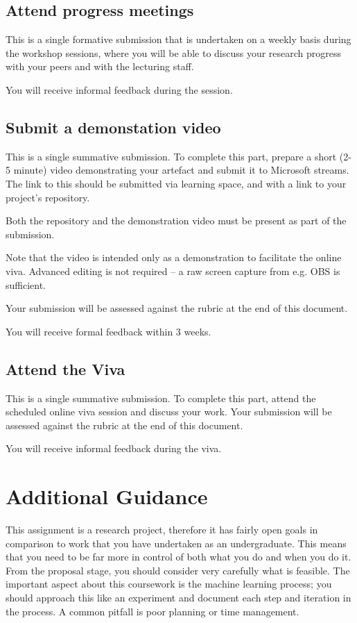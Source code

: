\documentclass{../fal_assignment}
\begin{document}
\subsection*{Attend progress meetings}
This is a single formative submission that is undertaken on a weekly basis during the workshop sessions, where you will be able to discuss your research progress with your peers and with the lecturing staff.

You will receive informal feedback during the session.

\subsection*{Submit a demonstation video}
This is a single summative submission. To complete this part, prepare a short (2-5 minute) video demonstrating your artefact and submit it to Microsoft streams. The link to this should be submitted via learning space, and with a link to your project's repository.

Both the repository and the demonstration video must be present as part of the submission.

Note that the video is intended only as a demonstration to facilitate the online viva. Advanced editing is not required – a raw screen capture from e.g. OBS is sufficient.

Your submission will be assessed against the rubric at the end of this document.

You will receive formal feedback within 3 weeks.

\subsection*{Attend the Viva}
This is a single summative submission. To complete this part, attend the scheduled online viva session and discuss your work. Your submission will be assessed against the rubric at the end of this document.

You will receive informal feedback during the viva.

\section*{Additional Guidance}
This assignment is a research project, therefore it has fairly open goals in comparison to work that you have undertaken as an undergraduate. This means that you need to be far more in control of both what you do and when you do it. From the proposal stage, you should consider very carefully what is feasible. The important aspect about this coursework is the machine learning process; you should approach this like an experiment and document each step and iteration in the process. A common pitfall is poor planning or time management.
\end{document}
